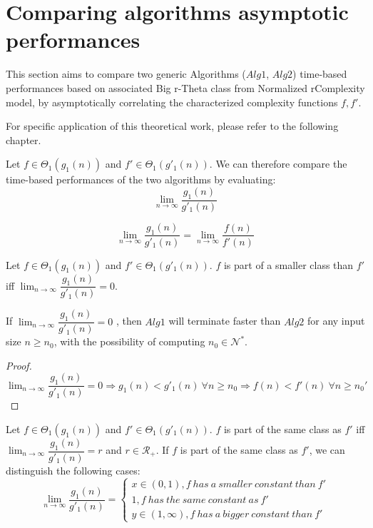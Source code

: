 \section{Comparing algorithms asymptotic performances}


This section aims to compare two generic Algorithms ($Alg1$, $Alg2$) time-based performances based on associated Big r-Theta class from Normalized rComplexity model, by asymptotically correlating the characterized complexity functions $f, f'$.

For specific application of this theoretical work, please refer to the following chapter.

Let $f \in \Theta_{1}(g_{1}(n))$ and $f' \in \Theta_{1}(g'_{1}(n))$.
We can therefore compare the time-based performances of the two algorithms by evaluating:  \[\lim_{n\to\infty} \dfrac{g_{1}(n)}{g'_{1}(n)}\]

\begin{remark}
    \[\lim_{n\to\infty} \dfrac{g_{1}(n)}{g'_{1}(n)} = \lim_{n\to\infty} \dfrac{f(n)}{f'(n)}\]
\end{remark}

\begin{definition}
    Let $f \in \Theta_{1}(g_{1}(n))$ and $f' \in \Theta_{1}(g'_{1}(n))$. $f$ is part of a smaller class than $f'$ iff $\lim_{n\to\infty} \dfrac{g_{1}(n)}{g'_{1}(n)} = 0$.
\end{definition}
\begin{lemma}
    If  $ \lim_{n\to\infty} \dfrac{g_{1}(n)}{g'_{1}(n)} = 0 $ , then $Alg1$ will terminate faster than $Alg2$ for any input size $n \geq n_{0}$, with the possibility of computing $n_{0} \in \mathcal{N}^{*}$.
\end{lemma}
\begin{proof}
    $\lim_{n\to\infty} \dfrac{g_{1}(n)}{g'_{1}(n)} = 0 \Rightarrow g_{1}(n) < g'_{1}(n)\ \forall n \geq n_{0} \Rightarrow f(n) < f'(n) \ \forall n \geq n_{0}'$
\end{proof}

\begin{definition}
    Let $f \in \Theta_{1}(g_{1}(n))$ and $f' \in \Theta_{1}(g'_{1}(n))$. $f$ is part of the same class as $f'$ iff $\lim_{n\to\infty} \dfrac{g_{1}(n)}{g'_{1}(n)} = r$ and $r \in \mathcal{R}_{+}$.
    If $f$ is part of the same class as $f'$, we can distinguish the following cases:
    $$
    \lim_{n\to\infty} \dfrac{g_{1}(n)}{g'_{1}(n)} =
    \begin{cases}
        x \in (0,1), f\ has\ a\ smaller\ constant\ than\ f' \\
        1, f\ has\ the\ same\ constant\ as\ f'\\
        y \in (1,\infty), f\ has\ a\ bigger\ constant\ than\ f'
    \end{cases}
    $$
\end{definition}

